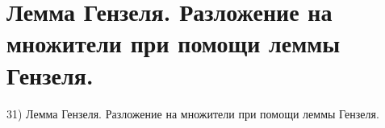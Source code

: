 \section{
 Лемма Гензеля. Разложение на множители при помощи леммы Гензеля.
}

31) Лемма Гензеля. Разложение на множители при помощи леммы Гензеля.
